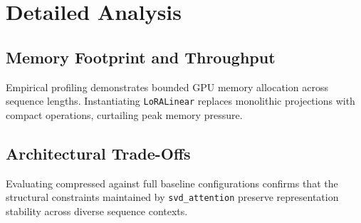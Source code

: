 \section{Detailed Analysis}

\subsection{Memory Footprint and Throughput}
Empirical profiling demonstrates bounded GPU memory allocation across sequence lengths. Instantiating \texttt{LoRALinear} replaces monolithic projections with compact operations, curtailing peak memory pressure.

\subsection{Architectural Trade-Offs}
Evaluating compressed against full baseline configurations confirms that the structural constraints maintained by \texttt{svd_attention} preserve representation stability across diverse sequence contexts.
